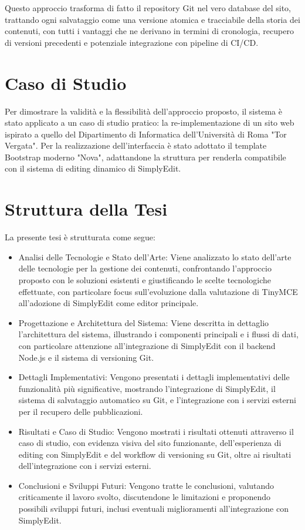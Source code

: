 Questo approccio trasforma di fatto il repository Git nel vero database del sito, trattando ogni salvataggio come una versione atomica e tracciabile della storia dei contenuti, con tutti i vantaggi che ne derivano in termini di cronologia, recupero di versioni precedenti e potenziale integrazione con pipeline di CI/CD.

\section{Caso di Studio}
Per dimostrare la validità e la flessibilità dell'approccio proposto, il sistema è stato applicato a un caso di studio pratico: la re-implementazione di un sito web ispirato a quello del Dipartimento di Informatica dell'Università di Roma "Tor Vergata". Per la realizzazione dell'interfaccia è stato adottato il template Bootstrap moderno "Nova", adattandone la struttura per renderla compatibile con il sistema di editing dinamico di SimplyEdit. 

\section{Struttura della Tesi}
La presente tesi è strutturata come segue:
\begin{itemize}
    \item[\textbf{Capitolo 2}] Analisi delle Tecnologie e Stato dell'Arte: Viene analizzato lo stato dell'arte delle tecnologie per la gestione dei contenuti, confrontando l'approccio proposto con le soluzioni esistenti e giustificando le scelte tecnologiche effettuate, con particolare focus sull'evoluzione dalla valutazione di TinyMCE all'adozione di SimplyEdit come editor principale.
    \item[\textbf{Capitolo 3}] Progettazione e Architettura del Sistema: Viene descritta in dettaglio l'architettura del sistema, illustrando i componenti principali e i flussi di dati, con particolare attenzione all'integrazione di SimplyEdit con il backend Node.js e il sistema di versioning Git.
    \item[\textbf{Capitolo 4}] Dettagli Implementativi: Vengono presentati i dettagli implementativi delle funzionalità più significative, mostrando l'integrazione di SimplyEdit, il sistema di salvataggio automatico su Git, e l'integrazione con i servizi esterni per il recupero delle pubblicazioni.
    \item[\textbf{Capitolo 5}] Risultati e Caso di Studio: Vengono mostrati i risultati ottenuti attraverso il caso di studio, con evidenza visiva del sito funzionante, dell'esperienza di editing con SimplyEdit e del workflow di versioning su Git, oltre ai risultati dell'integrazione con i servizi esterni.
    \item[\textbf{Capitolo 6}] Conclusioni e Sviluppi Futuri: Vengono tratte le conclusioni, valutando criticamente il lavoro svolto, discutendone le limitazioni e proponendo possibili sviluppi futuri, inclusi eventuali miglioramenti all'integrazione con SimplyEdit.
\end{itemize}